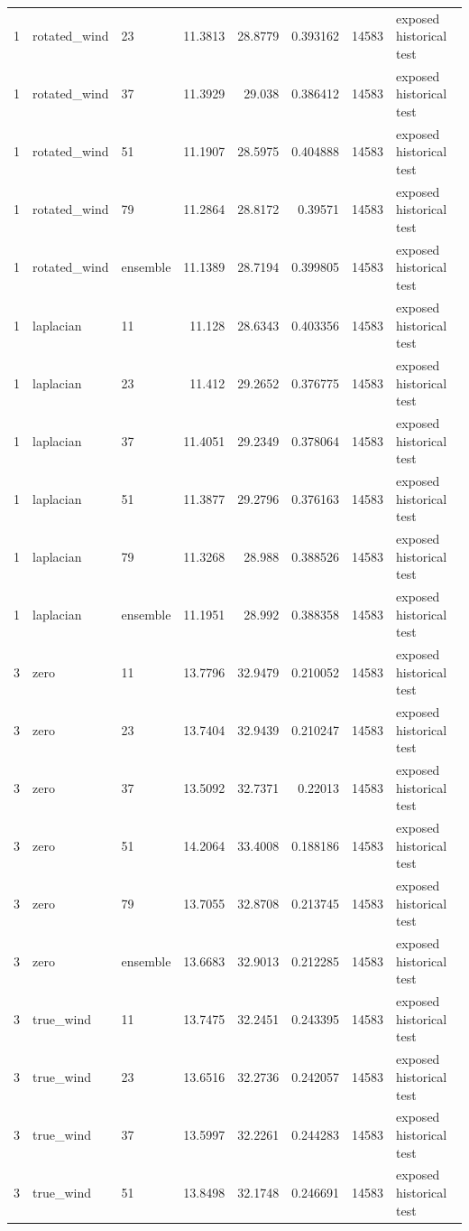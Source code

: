 \begin{tabular}{rllrrrrl}
1 & rotated\_wind & 23 & 11.3813 & 28.8779 & 0.393162 & 14583 & exposed historical test \\
1 & rotated\_wind & 37 & 11.3929 & 29.038 & 0.386412 & 14583 & exposed historical test \\
1 & rotated\_wind & 51 & 11.1907 & 28.5975 & 0.404888 & 14583 & exposed historical test \\
1 & rotated\_wind & 79 & 11.2864 & 28.8172 & 0.39571 & 14583 & exposed historical test \\
1 & rotated\_wind & ensemble & 11.1389 & 28.7194 & 0.399805 & 14583 & exposed historical test \\
1 & laplacian & 11 & 11.128 & 28.6343 & 0.403356 & 14583 & exposed historical test \\
1 & laplacian & 23 & 11.412 & 29.2652 & 0.376775 & 14583 & exposed historical test \\
1 & laplacian & 37 & 11.4051 & 29.2349 & 0.378064 & 14583 & exposed historical test \\
1 & laplacian & 51 & 11.3877 & 29.2796 & 0.376163 & 14583 & exposed historical test \\
1 & laplacian & 79 & 11.3268 & 28.988 & 0.388526 & 14583 & exposed historical test \\
1 & laplacian & ensemble & 11.1951 & 28.992 & 0.388358 & 14583 & exposed historical test \\
3 & zero & 11 & 13.7796 & 32.9479 & 0.210052 & 14583 & exposed historical test \\
3 & zero & 23 & 13.7404 & 32.9439 & 0.210247 & 14583 & exposed historical test \\
3 & zero & 37 & 13.5092 & 32.7371 & 0.22013 & 14583 & exposed historical test \\
3 & zero & 51 & 14.2064 & 33.4008 & 0.188186 & 14583 & exposed historical test \\
3 & zero & 79 & 13.7055 & 32.8708 & 0.213745 & 14583 & exposed historical test \\
3 & zero & ensemble & 13.6683 & 32.9013 & 0.212285 & 14583 & exposed historical test \\
3 & true\_wind & 11 & 13.7475 & 32.2451 & 0.243395 & 14583 & exposed historical test \\
3 & true\_wind & 23 & 13.6516 & 32.2736 & 0.242057 & 14583 & exposed historical test \\
3 & true\_wind & 37 & 13.5997 & 32.2261 & 0.244283 & 14583 & exposed historical test \\
3 & true\_wind & 51 & 13.8498 & 32.1748 & 0.246691 & 14583 & exposed historical test \\

\end{tabular}
